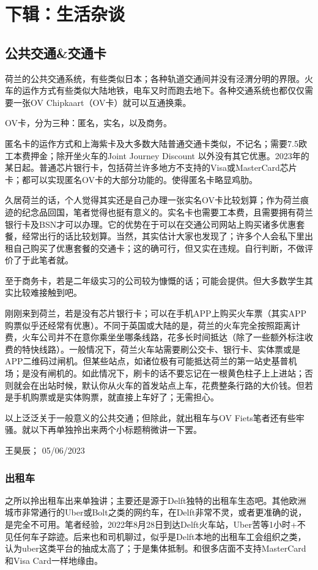 \section{下辑：生活杂谈}

\vspace{\betsubsec} %
\subsection{公共交通\&交通卡}
荷兰的公共交通系统，有些类似日本；各种轨道交通间并没有泾渭分明的界限。火车的运作方式有些类似大陆地铁，电车又时而跑去地下。各种交通系统也都仅仅需要一张OV Chipkaart（OV卡）就可以互通换乘。

OV卡，分为三种：匿名，实名，以及商务。

匿名卡的运作方式和上海紫卡及大多数大陆普通交通卡类似，不记名；需要7.5欧工本费押金；除开坐火车的Joint Journey Discount 以外没有其它优惠。2023年的某日起。普通芯片银行卡，包括荷兰许多地方不支持的Visa或MasterCard芯片卡；都可以实现匿名OV卡的大部分功能的。使得匿名卡略显鸡肋。

久居荷兰的话，个人觉得其实还是自己办理一张实名OV卡比较划算；作为荷兰痕迹的纪念品回国，笔者觉得也挺有意义的。实名卡也需要工本费，且需要拥有荷兰银行卡及BSN才可以办理。它的优势在于可以在交通公司网站上购买诸多优惠套餐，经常出行的话比较划算。当然，其实估计大家也发现了；许多个人会私下里出租自己购买了优惠套餐的交通卡；这的确可行，但又实在违规。自行判断，不做评价了于此笔者就。

至于商务卡，若是二年级实习的公司较为慷慨的话；可能会提供。但大多数学生其实比较难接触到吧。

刚刚来到荷兰，若是没有芯片银行卡；可以在手机APP上购买火车票（其实APP购票似乎还经常有优惠）。不同于英国或大陆的是，荷兰的火车完全按照距离计费，火车公司并不在意你乘坐坐哪条线路，花多长时间抵达（除了一些额外标注收费的特快线路）。一般情况下，荷兰火车站需要刷公交卡、银行卡、实体票或是APP二维码过闸机。但某些站点，如诸位极有可能抵达荷兰的第一站史基普机场；是没有闸机的。如此情况下，刷卡的话不要忘记在一根黄色柱子上上进站；否则就会在出站时候，默认你从火车的首发站点上车，花费整条行路的大价钱。但若是手机购票或是实体购票，就直接上车好了；无需担心。

以上泛泛关于一般意义的公共交通；但除此，就出租车与OV Fiets笔者还有些牢骚。就以下再单独拎出来两个小标题稍微讲一下罢。
\begin{flushright}
王昊辰； 05/06/2023
\end{flushright}

\subsubsection{出租车}
之所以拎出租车出来单独讲；主要还是源于Delft独特的出租车生态吧。其他欧洲城市非常通行的Uber或Bolt之类的网约车，在Delft非常不灵，或者更准确的说，是完全不可用。笔者经验，2022年8月28日到达Delft火车站，Uber苦等1小时+不见任何车子踪迹。后来也和司机聊过，似乎是Delft本地的出租车工会组织之类，认为uber这类平台的抽成太高了；于是集体抵制。和很多店面不支持MasterCard和Visa Card一样地缘由。

